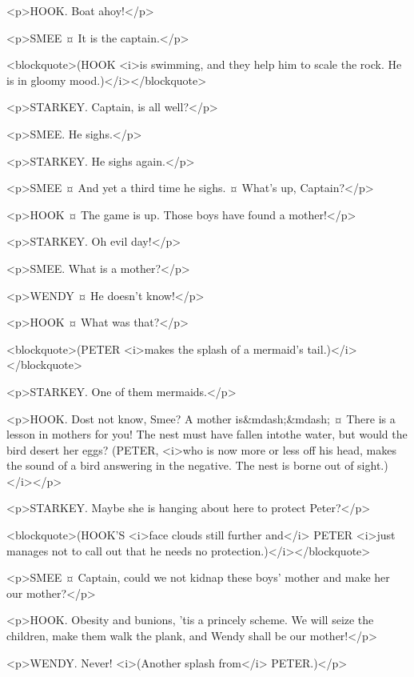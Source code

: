 <p>HOOK. Boat ahoy!</p>

<p>SMEE ¤
It is the captain.</p>

<blockquote>(HOOK <i>is swimming, and they help him to scale the rock. He is in gloomy mood.)</i></blockquote>

<p>STARKEY. Captain, is all well?</p>

<p>SMEE. He sighs.</p>

<p>STARKEY. He sighs again.</p>

<p>SMEE ¤
And yet a third time he sighs.
¤
What's up, Captain?</p>

<p>HOOK ¤
The game is up. Those boys have found a mother!</p>

<p>STARKEY. Oh evil day!</p>

<p>SMEE. What is a mother?</p>

<p>WENDY ¤
He doesn't know!</p>

<p>HOOK ¤
What was that?</p>

<blockquote>(PETER <i>makes the splash of a mermaid's tail.)</i></blockquote>

<p>STARKEY. One of them mermaids.</p>

<p>HOOK. Dost not know, Smee? A mother is&mdash;&mdash;
¤
There is a lesson in mothers for you! The nest must have fallen intothe water, but would the bird desert her eggs? (PETER, <i>who is now more or less off his head, makes the sound of a bird answering in the negative. The nest is borne out of sight.)</i></p>

<p>STARKEY. Maybe she is hanging about here to protect Peter?</p>

<blockquote>(HOOK'S <i>face clouds still further and</i> PETER <i>just manages not to call out that he needs no protection.)</i></blockquote>

<p>SMEE ¤
Captain, could we not kidnap these boys' mother and make her our mother?</p>

<p>HOOK. Obesity and bunions, 'tis a princely scheme. We will seize the children, make them walk the plank, and Wendy shall be our mother!</p>

<p>WENDY. Never! <i>(Another splash from</i> PETER.)</p>

